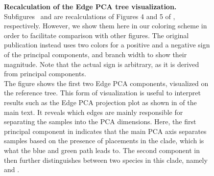 \begin{figure}[hpbt]
    \centering
    \begin{subfigure}{0pt}
        \label{fig:epca:sub:comp1}
    \end{subfigure}
    \begin{subfigure}{0pt}
        \label{fig:epca:sub:comp2}
    \end{subfigure}
    \caption[Recalculation of the Edge PCA tree visualization]{
        \textbf{Recalculation of the Edge PCA tree visualization.}
        Subfigures~ and  are recalculations
        of Figures 4 and 5 of \cite{Matsen2011a}, respectively.
        However, we show them here in our coloring scheme in order to facilitate comparison with other figures.
        The original publication instead uses two colors for a positive and a negative sign of the principal components,
        and branch width to show their magnitude.
        Note that the actual sign is arbitrary, as it is derived from principal components.
        \\
        The figure shows the first two Edge PCA components, visualized on the reference tree.
        This form of visualization is useful to interpret results such as the Edge PCA projection plot
        as shown in  of the main text.
        It reveals which edges are mainly responsible for separating the samples into the PCA dimensions.
        Here, the first principal component in  indicates that the main PCA axis
        separates samples based on the presence of placements in the  clade,
        which is what the blue and green path leads to.
        The second component in  then further distinguishes between two species
        in this clade, namely  and .
    }
    \label{fig:epca}
\end{figure}


